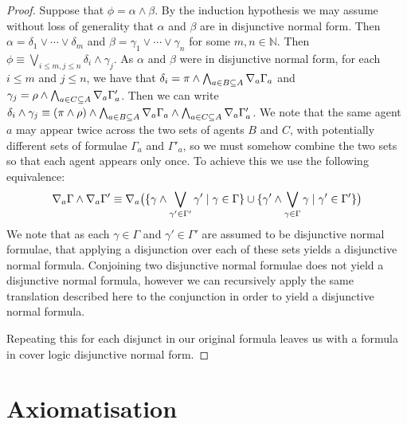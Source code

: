 \begin{proof}
Suppose that $\phi = \alpha \land \beta$. By the induction hypothesis we may
assume without loss of generality that $\alpha$ and $\beta$ are in disjunctive
normal form. Then $\alpha = \delta_1 \lor \cdots \lor \delta_m$ and $\beta =
\gamma_1 \lor \cdots \lor \gamma_n$ for some $m, n \in \mathbb{N}$.  Then $\phi
\equiv \bigvee_{i \leq m, j \leq n} \delta_i \land \gamma_j$. As $\alpha$ and
$\beta$ were in disjunctive normal form, for each $i \leq m$ and $j
\leq n$, we have that $\delta_i = \pi \land \bigwedge_{a \in B \subseteq A}
\nabla_a \Gamma_a$ and $\gamma_j = \rho \land \bigwedge_{a \in C \subseteq A}
\nabla_a \Gamma'_a$. Then we can write $\delta_i \land \gamma_j \equiv (\pi
\land \rho) \land \bigwedge_{a \in B \subseteq A} \nabla_a \Gamma_a \land
\bigwedge_{a \in C \subseteq A} \nabla_a \Gamma'_a$. We note that the same
agent $a$ may appear twice across the two sets of agents $B$ and $C$, with
potentially different sets of formulae $\Gamma_a$ and $\Gamma'_a$, so we must
somehow combine the two sets so that each agent appears only once. To achieve
this we use the following equivalence:
$$
\nabla_a \Gamma \land \nabla_a \Gamma' \equiv 
\nabla_a \big( 
\{ \gamma \land \bigvee_{\gamma' \in \Gamma'} \gamma' \mid \gamma \in \Gamma \}
\cup
\{ \gamma' \land \bigvee_{\gamma \in \Gamma} \gamma \mid \gamma' \in \Gamma' \}
\big)
$$
We note that as each $\gamma \in \Gamma$ and $\gamma' \in \Gamma'$ are assumed
to be disjunctive normal formulae, that applying a disjunction over each of
these sets yields a disjunctive normal formula. Conjoining two disjunctive
normal formulae does not yield a disjunctive normal formula, however we can
recursively apply the same translation described here to the conjunction in
order to yield a disjunctive normal formula.

Repeating this for each disjunct in our original formula leaves us with a
formula in cover logic disjunctive normal form.
\end{proof}

\section{Axiomatisation}


